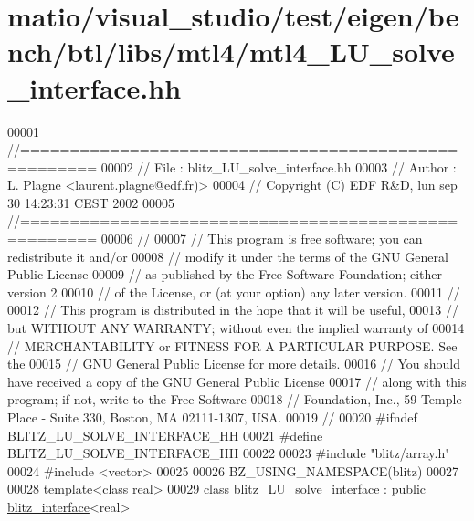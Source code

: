 \hypertarget{matio_2visual__studio_2test_2eigen_2bench_2btl_2libs_2mtl4_2mtl4___l_u__solve__interface_8hh_source}{}\section{matio/visual\+\_\+studio/test/eigen/bench/btl/libs/mtl4/mtl4\+\_\+\+L\+U\+\_\+solve\+\_\+interface.hh}
\label{matio_2visual__studio_2test_2eigen_2bench_2btl_2libs_2mtl4_2mtl4___l_u__solve__interface_8hh_source}

\begin{DoxyCode}
00001 \textcolor{comment}{//=====================================================}
00002 \textcolor{comment}{// File   :  blitz\_LU\_solve\_interface.hh}
00003 \textcolor{comment}{// Author :  L. Plagne <laurent.plagne@edf.fr)>        }
00004 \textcolor{comment}{// Copyright (C) EDF R&D,  lun sep 30 14:23:31 CEST 2002}
00005 \textcolor{comment}{//=====================================================}
00006 \textcolor{comment}{// }
00007 \textcolor{comment}{// This program is free software; you can redistribute it and/or}
00008 \textcolor{comment}{// modify it under the terms of the GNU General Public License}
00009 \textcolor{comment}{// as published by the Free Software Foundation; either version 2}
00010 \textcolor{comment}{// of the License, or (at your option) any later version.}
00011 \textcolor{comment}{// }
00012 \textcolor{comment}{// This program is distributed in the hope that it will be useful,}
00013 \textcolor{comment}{// but WITHOUT ANY WARRANTY; without even the implied warranty of}
00014 \textcolor{comment}{// MERCHANTABILITY or FITNESS FOR A PARTICULAR PURPOSE.  See the}
00015 \textcolor{comment}{// GNU General Public License for more details.}
00016 \textcolor{comment}{// You should have received a copy of the GNU General Public License}
00017 \textcolor{comment}{// along with this program; if not, write to the Free Software}
00018 \textcolor{comment}{// Foundation, Inc., 59 Temple Place - Suite 330, Boston, MA  02111-1307, USA.}
00019 \textcolor{comment}{// }
00020 \textcolor{preprocessor}{#ifndef BLITZ\_LU\_SOLVE\_INTERFACE\_HH}
00021 \textcolor{preprocessor}{#define BLITZ\_LU\_SOLVE\_INTERFACE\_HH}
00022 
00023 \textcolor{preprocessor}{#include "blitz/array.h"}
00024 \textcolor{preprocessor}{#include <vector>}
00025 
00026 BZ\_USING\_NAMESPACE(blitz)
00027 
00028 \textcolor{keyword}{template}<\textcolor{keyword}{class} real>
00029 \textcolor{keyword}{class }\hyperlink{classblitz___l_u__solve__interface}{blitz\_LU\_solve\_interface} : \textcolor{keyword}{public} \hyperlink{classblitz__interface}{blitz\_interface}<real>

\end{DoxyCode}
